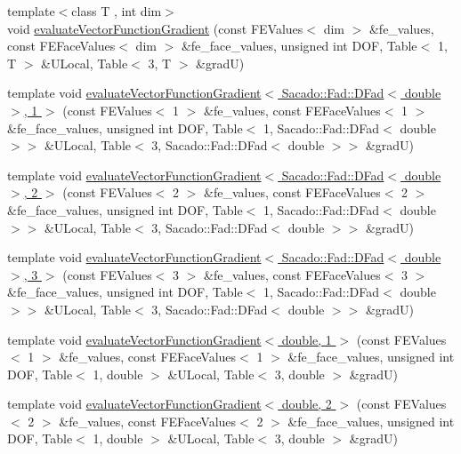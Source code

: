 \begin{DoxyCompactItemize}
\item 
{\footnotesize template$<$class T , int dim$>$ }\\void \hyperlink{group___evaluation_functions_gab2771d18ff704decbbc12ca2b848bbfe}{evaluate\-Vector\-Function\-Gradient} (const F\-E\-Values$<$ dim $>$ \&fe\-\_\-values, const F\-E\-Face\-Values$<$ dim $>$ \&fe\-\_\-face\-\_\-values, unsigned int D\-O\-F, Table$<$ 1, T $>$ \&U\-Local, Table$<$ 3, T $>$ \&grad\-U)
\item 
template void \hyperlink{function_evaluations_8cc_a0a0df4cf8cab669622b2a696651aca8b}{evaluate\-Vector\-Function\-Gradient$<$ Sacado\-::\-Fad\-::\-D\-Fad$<$ double $>$, 1 $>$} (const F\-E\-Values$<$ 1 $>$ \&fe\-\_\-values, const F\-E\-Face\-Values$<$ 1 $>$ \&fe\-\_\-face\-\_\-values, unsigned int D\-O\-F, Table$<$ 1, Sacado\-::\-Fad\-::\-D\-Fad$<$ double $>$$>$ \&U\-Local, Table$<$ 3, Sacado\-::\-Fad\-::\-D\-Fad$<$ double $>$$>$ \&grad\-U)
\item 
template void \hyperlink{function_evaluations_8cc_a955a54316c2cc8ddcd9c9d5b148d86ff}{evaluate\-Vector\-Function\-Gradient$<$ Sacado\-::\-Fad\-::\-D\-Fad$<$ double $>$, 2 $>$} (const F\-E\-Values$<$ 2 $>$ \&fe\-\_\-values, const F\-E\-Face\-Values$<$ 2 $>$ \&fe\-\_\-face\-\_\-values, unsigned int D\-O\-F, Table$<$ 1, Sacado\-::\-Fad\-::\-D\-Fad$<$ double $>$$>$ \&U\-Local, Table$<$ 3, Sacado\-::\-Fad\-::\-D\-Fad$<$ double $>$$>$ \&grad\-U)
\item 
template void \hyperlink{function_evaluations_8cc_af8f262e2bdb9eda799771e932e7bf340}{evaluate\-Vector\-Function\-Gradient$<$ Sacado\-::\-Fad\-::\-D\-Fad$<$ double $>$, 3 $>$} (const F\-E\-Values$<$ 3 $>$ \&fe\-\_\-values, const F\-E\-Face\-Values$<$ 3 $>$ \&fe\-\_\-face\-\_\-values, unsigned int D\-O\-F, Table$<$ 1, Sacado\-::\-Fad\-::\-D\-Fad$<$ double $>$$>$ \&U\-Local, Table$<$ 3, Sacado\-::\-Fad\-::\-D\-Fad$<$ double $>$$>$ \&grad\-U)
\item 
template void \hyperlink{function_evaluations_8cc_ac57e06f570eda3571e00912325612971}{evaluate\-Vector\-Function\-Gradient$<$ double, 1 $>$} (const F\-E\-Values$<$ 1 $>$ \&fe\-\_\-values, const F\-E\-Face\-Values$<$ 1 $>$ \&fe\-\_\-face\-\_\-values, unsigned int D\-O\-F, Table$<$ 1, double $>$ \&U\-Local, Table$<$ 3, double $>$ \&grad\-U)
\item 
template void \hyperlink{function_evaluations_8cc_a729ea5c9032a46494dbeb1c6e1a678c6}{evaluate\-Vector\-Function\-Gradient$<$ double, 2 $>$} (const F\-E\-Values$<$ 2 $>$ \&fe\-\_\-values, const F\-E\-Face\-Values$<$ 2 $>$ \&fe\-\_\-face\-\_\-values, unsigned int D\-O\-F, Table$<$ 1, double $>$ \&U\-Local, Table$<$ 3, double $>$ \&grad\-U)

\end{DoxyCompactItemize}
